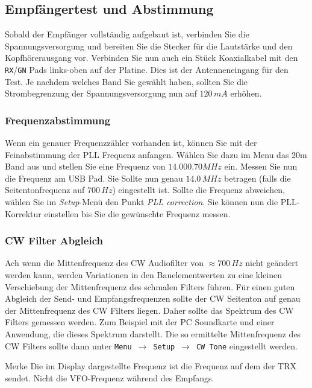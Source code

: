 \documentclass[10pt, a4paper,twoside]{scrartcl}
\newenvironment{remember}{\begin{bclogo}[couleur=blue!30,arrondi=.1,logo=\bccrayon,ombre=true]{Merke}}{\end{bclogo}}
\begin{document}
\subsection{Empfängertest und Abstimmung}
Sobald der Empfänger vollständig aufgebaut ist, verbinden Sie die Spannungsversorgung und bereiten Sie die Stecker für die Lautstärke und den Kopfhörerausgang vor. Verbinden Sie nun auch ein Stück Koaxialkabel mit den \texttt{RX}/\texttt{GN} Pads links-oben auf der Platine. Dies ist der Antenneneingang für den Test. Je nachdem welches Band Sie gewählt haben, sollten Sie die Strombegrenzung der Spannungsversorgung nun auf $120\,mA$ erhöhen.

\subsubsection{Frequenzabstimmung}
Wenn ein genauer Frequenzzähler vorhanden ist, können Sie mit der Feinabstimmung der PLL Frequenz anfangen. Wählen Sie dazu im Menu das 20m Band aus und stellen Sie eine Frequenz von $14.000.70 MHz$ ein. Messen Sie nun die Frequenz am USB Pad. Sie Sollte nun genau $14.0\,MHz$ betragen (falls die Seitentonfrequenz auf $700\,Hz$) eingestellt ist. Sollte die Frequenz abweichen, wählen Sie im \emph{Setup}-Menü den Punkt \emph{PLL correction}. Sie können nun die PLL-Korrektur einstellen bis Sie die gewünschte Frequenz messen.

\subsubsection{CW Filter Abgleich}
Ach wenn die Mittenfrequenz des CW Audiofilter von $\approx 700\,Hz$ nicht geändert werden kann, werden Variationen in den Bauelementwerten zu eine kleinen Verschiebung der Mittenfrequenz des schmalen Filters führen. Für einen guten Abgleich der Send- und Empfangsfrequenzen sollte der CW Seitenton auf genau der Mittenfrequenz des CW Filters liegen. Daher sollte das Spektrum des CW Filters gemessen werden. Zum Beispiel mit der PC Soundkarte und einer Anwendung, die dieses Spektrum darstellt. Die so ermittelte Mittenfrequenz des CW Filters sollte dann unter \texttt{Menu}\ $\rightarrow$\ \texttt{Setup}\ $\rightarrow$\ \texttt{CW Tone} eingestellt werden.

\begin{remember}
Die im Display dargestellte Frequenz ist die Frequenz auf dem der TRX sendet. Nicht die VFO-Frequenz während des Empfangs.
\end{remember}
\end{document}
